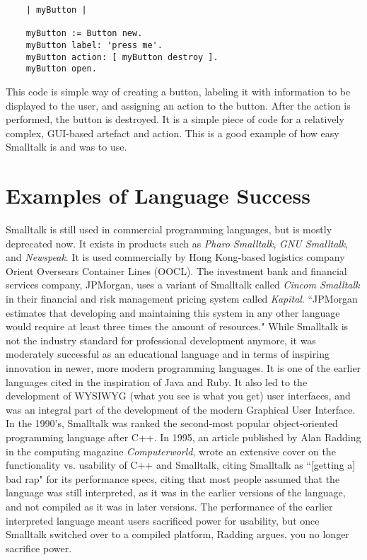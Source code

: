 \documentclass{article}
\begin{document}
\begin{lstlisting}
    | myButton |

    myButton := Button new.
    myButton label: 'press me'.
    myButton action: [ myButton destroy ].
    myButton open.

\end{lstlisting}
This code is  simple way of creating a button, labeling it with information to be displayed to the user, and assigning an action to the button. After the action is performed, the button is destroyed. It is a simple piece of code for a relatively complex, GUI-based artefact and action. This is a good example of how easy Smalltalk is and was to use.

\section*{Examples of Language Success}
Smalltalk is still used in commercial programming languages, but is mostly deprecated now. It exists in products such as \textit{Pharo Smalltalk}, \textit{GNU Smalltalk}, and \textit{Newspeak}. It is used commercially by Hong Kong-based logistics company Orient Oversears Container Lines (OOCL).
\newline
The investment bank and financial services company, JPMorgan, uses a variant of Smalltalk called \textit{Cincom Smalltalk} in their financial and risk management pricing system called \textit{Kapital}. ``JPMorgan estimates that developing and maintaining this system in any other language would require at least three times the amount of resources."
\newline
While Smalltalk is not the industry standard for professional development anymore, it was moderately successful as an educational language and in terms of inspiring innovation in newer, more modern programming languages. It is one of the earlier languages cited in the inspiration of Java and Ruby. It also led to the development of WYSIWYG (what you see is what you get) user interfaces, and was an integral part of the development of the modern Graphical User Interface. 
\newline
In the 1990's, Smalltalk was ranked the second-most popular object-oriented programming language after C++. In 1995, an article published by Alan Radding in the computing magazine \textit{Computerworld}, wrote an extensive cover on the functionality vs. usability of C++ and Smalltalk, citing Smalltalk as ``[getting a] bad rap" for its performance specs, citing that most people assumed that the language was still interpreted, as it was in the earlier versions of the language, and not compiled as it was in later versions. The performance of the earlier interpreted language meant users sacrificed power for usability, but once Smalltalk switched over to a compiled platform, Radding argues, you no longer sacrifice power.


\end{document}
